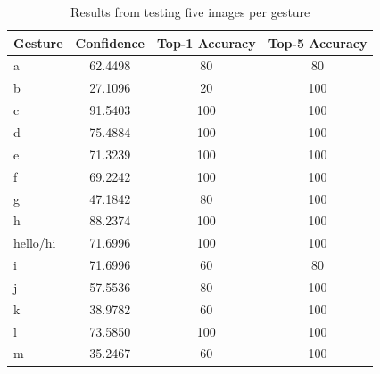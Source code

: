 \documentclass[journal]{./IEEE/IEEEtran}
\begin{document}
\begin{table}[ht!]
\centering
\caption{Results from testing five images per gesture}
\begin{tabular}{|l|c|c|c|}
\hline
\multicolumn{1}{|c|}{\textbf{Gesture}} & \textbf{Confidence} & \textbf{Top-1 Accuracy} & \textbf{Top-5 Accuracy} \\ \hline
a                                      & 62.4498                   & 80                      & 80                      \\ \hline
b                                      & 27.1096                   & 20                      & 100                     \\ \hline
c                                      & 91.5403                   & 100                     & 100                     \\ \hline
d                                      & 75.4884                   & 100                     & 100                     \\ \hline
e                                      & 71.3239                   & 100                     & 100                     \\ \hline
f                                      & 69.2242                   & 100                     & 100                     \\ \hline
g                                      & 47.1842                   & 80                      & 100                     \\ \hline
h                                      & 88.2374                   & 100                     & 100                     \\ \hline
hello/hi                             & 71.6996                   & 100                     & 100                     \\ \hline
i                                      & 71.6996                   & 60                      & 80                      \\ \hline
j                                      & 57.5536                   & 80                      & 100                     \\ \hline
k                                      & 38.9782                   & 60                      & 100                     \\ \hline
l                                      & 73.5850                   & 100                     & 100                     \\ \hline
m                                      & 35.2467                   & 60                      & 100                     \\ \hline

\end{tabular}
\end{table}
\end{document}
